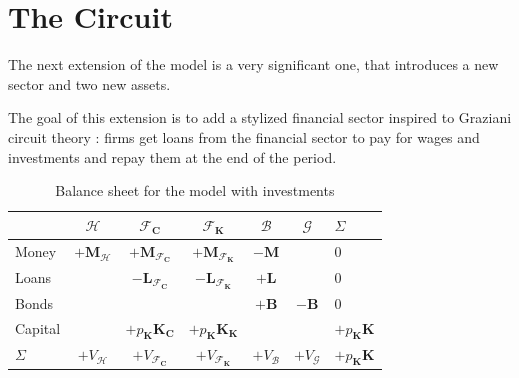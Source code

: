 \chapter{The Circuit}
The next extension of the model is a very significant one, that introduces a new sector and two new assets.

The goal of this extension is to add a stylized financial sector inspired to Graziani circuit theory \parencite{passarella2024, caiani2017}: firms get loans from the financial sector to pay for wages and investments and repay them at the end of the period.

\begin{table}
    \centering
    \begin{tabular}{l|ccccc|l}
                 & $\mathcal{H}$             & $\mathcal{F}_\mathbf{C}$               & $\mathcal{F}_\mathbf{K}$               & $\mathcal{B}$    & $\mathcal{G}$    & $\Sigma$                   \\
        \midrule
        Money    & $+\mathbf{M}_\mathcal{H}$ & $+\mathbf{M}_{\mathcal{F}_\mathbf{C}}$ & $+\mathbf{M}_{\mathcal{F}_\mathbf{K}}$ & $-\mathbf{M}$    &                  & 0                          \\
        Loans    &                           & $-\mathbf{L}_{\mathcal{F}_\mathbf{C}}$ & $-\mathbf{L}_{\mathcal{F}_\mathbf{K}}$ & $+\mathbf{L}$    &                  & 0                          \\
        Bonds    &                           &                                        &                                        & $+\mathbf{B}$    & $-\mathbf{B}$    & 0                          \\
        \midrule
        Capital  &                           & $+p_\mathbf{K} \mathbf{K}_\mathbf{C}$  & $+p_\mathbf{K} \mathbf{K}_\mathbf{K}$  &                  &                  & $+p_\mathbf{K} \mathbf{K}$ \\
        \midrule
        $\Sigma$ & $+V_\mathcal{H}$          & $+V_{\mathcal{F}_\mathbf{C}}$          & $+V_{\mathcal{F}_\mathbf{K}}$          & $+V_\mathcal{B}$ & $+V_\mathcal{G}$ & $+p_\mathbf{K} \mathbf{K}$ \\
    \end{tabular}
    \caption{Balance sheet for the model with investments}
\end{table}

